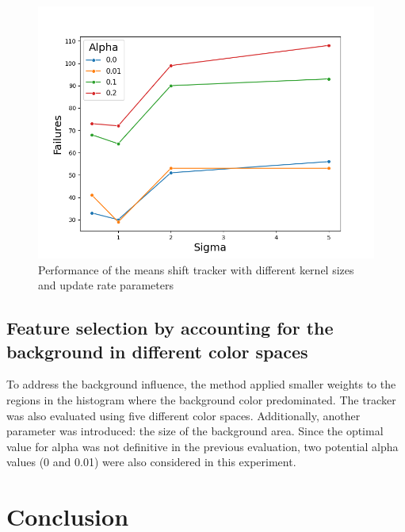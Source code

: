 \documentclass[9pt]{IEEEtran}
\begin{document}
\begin{figure}[h]
  \centering
  \includegraphics[width=0.99\columnwidth]{figures/sigma_alpha.png}
  \caption{Performance of the means shift tracker with different kernel sizes and update rate
  parameters}
  \label{fig:params2}
\end{figure}

\subsection{Feature selection by accounting for the background in different color spaces}
To address the background influence, the method applied smaller weights to the
 regions in the histogram where the background color predominated. The tracker
  was also evaluated using five different color spaces. Additionally, another
   parameter was introduced: the size of the background area. Since the optimal 
   value for alpha was not definitive in the previous evaluation, two potential 
   alpha values (0 and 0.01) were also considered in this experiment.  


\section{Conclusion}




\end{document}

